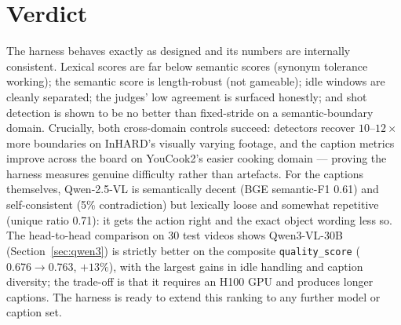 \documentclass[10pt,letterpaper]{article}
\begin{document}
\section{Verdict}

The harness behaves exactly as designed and its numbers are internally consistent. Lexical
scores are far below semantic scores (synonym tolerance working); the semantic score is
length-robust (not gameable); idle windows are cleanly separated; the judges' low agreement is
surfaced honestly; and shot detection is shown to be no better than fixed-stride on a
semantic-boundary domain. Crucially, both cross-domain controls succeed: detectors recover
$10$--$12\times$ more boundaries on InHARD's visually varying footage, and the caption metrics
improve across the board on YouCook2's easier cooking domain --- proving the harness measures
genuine difficulty rather than artefacts. For the captions themselves, Qwen-2.5-VL is
semantically decent (BGE semantic-F1 0.61) and self-consistent (5\% contradiction) but lexically
loose and somewhat repetitive (unique ratio 0.71): it gets the action right and the exact object
wording less so. The head-to-head comparison on 30 test videos shows Qwen3-VL-30B
(Section~\ref{sec:qwen3}) is strictly better on the composite \texttt{quality\_score} ($0.676 \to
0.763$, $+13\%$), with the largest gains in idle handling and caption diversity; the trade-off is
that it requires an H100 GPU and produces longer captions. The harness is ready to extend this
ranking to any further model or caption set.
\end{document}
